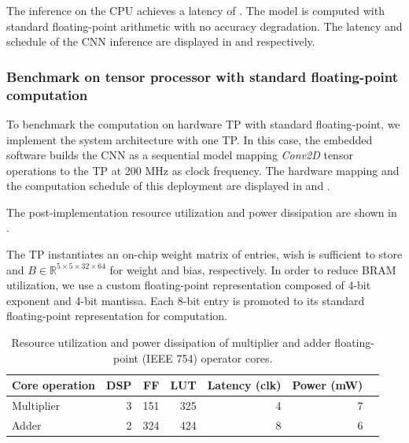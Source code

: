 The inference on the CPU achieves a latency of . The model is computed with standard floating-point arithmetic with no accuracy degradation. The latency and schedule of the CNN inference are displayed in  and  respectively.

\subsubsection{Benchmark on tensor processor with standard floating-point computation}
To benchmark the computation on hardware TP with standard floating-point, we implement the system architecture with one TP. In this case, the embedded software builds the CNN as a sequential model mapping \emph{Conv2D} tensor operations to the TP at 200 MHz as clock frequency. The hardware mapping and the computation schedule of this deployment are displayed in  and .

The post-implementation resource utilization and power dissipation are shown in .

The TP instantiates an on-chip weight matrix of  entries, wish is sufficient to store  and $B\in\mathbb{R}^{5\times 5\times 32\times 64}$ for weight and bias, respectively. In order to reduce BRAM utilization, we use a custom floating-point representation composed of 4-bit exponent and 4-bit mantissa. Each 8-bit entry is promoted to its standard floating-point representation for computation.



\begin{table}[!h]\centering
	\caption{Resource utilization and power dissipation of multiplier and adder floating-point (IEEE 754) operator cores.}\label{tab:LogiCORE}
	\scriptsize
	\begin{tabular}{lrrrrrr}\toprule
		\textbf{Core operation} &\textbf{DSP} &\textbf{FF} &\textbf{LUT} &\textbf{Latency (clk)} &\textbf{Power (mW)} \\\midrule
		Multiplier &3 &151 &325 &4 &7 \\
		Adder &2 &324 &424 &8 &6 \\
		\bottomrule
	\end{tabular}
\end{table}


